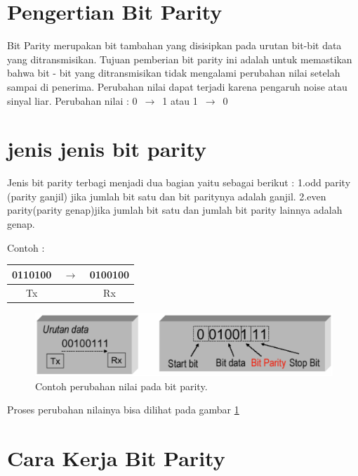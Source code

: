 
\section{Pengertian Bit Parity}
Bit Parity merupakan bit tambahan yang disisipkan pada urutan bit-bit data yang ditransmisikan.
Tujuan pemberian bit parity ini adalah untuk memastikan bahwa bit - bit yang ditransmisikan tidak mengalami perubahan nilai setelah sampai di penerima.
Perubahan nilai dapat terjadi karena pengaruh noise atau sinyal liar.
Perubahan nilai : 0 $\,\to\,$ 1 atau 1 $\,\to\,$ 0

\section{jenis jenis bit parity}
Jenis bit parity terbagi menjadi dua bagian yaitu sebagai berikut :
1.odd parity (parity ganjil) jika jumlah bit satu dan bit paritynya adalah ganjil.
2.even parity(parity genap)jika jumlah bit satu dan jumlah bit parity lainnya adalah genap.

\newline Contoh :

\begin{table}[h!]
\centering
\begin{tabular}{ c c c }
0110100 & $\,\to\,$ &  0100100\\
\hline
Tx &  & Rx \\
\end{tabular}
\end{table}

\begin{figure}[ht]
\centerline{\includegraphics[width=1\textwidth]{figures/perubahan_nilai_bit_parity.png}}
\caption{Contoh perubahan nilai pada bit parity.}
\label{perubahan_nilai_bit_parity}
\end{figure}

Proses perubahan nilainya bisa dilihat pada gambar \ref{perubahan_nilai_bit_parity}

\section{Cara Kerja Bit Parity}

